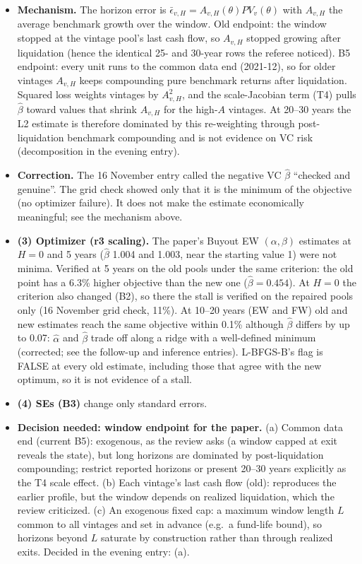 \documentclass[11pt]{article}
\newcommand{\code}[1]{\texttt{\detokenize{#1}}}
\begin{document}
\begin{itemize}
\item \textbf{Mechanism.} The horizon error is $\bar\epsilon_{v,H}=A_{v,H}(\theta)PV_v(\theta)$ with $A_{v,H}$ the average benchmark growth over the window. Old endpoint: the window stopped at the vintage pool's last cash flow, so $A_{v,H}$ stopped growing after liquidation (hence the identical 25- and 30-year rows the referee noticed). B5 endpoint: every unit runs to the common data end (2021-12), so for older vintages $A_{v,H}$ keeps compounding pure benchmark returns after liquidation. Squared loss weights vintages by $A_{v,H}^2$, and the scale-Jacobian term (T4) pulls $\hat\beta$ toward values that shrink $A_{v,H}$ for the high-$A$ vintages. At 20--30 years the L2 estimate is therefore dominated by this re-weighting through post-liquidation benchmark compounding and is not evidence on VC risk (decomposition in the evening entry).
\item \textbf{Correction.} The 16 November entry called the negative VC $\hat\beta$ ``checked and genuine''. The grid check showed only that it is the minimum of the objective (no optimizer failure). It does not make the estimate economically meaningful; see the mechanism above.
\item \textbf{(3) Optimizer (r3 scaling).} The paper's Buyout EW $(\alpha,\beta)$ estimates at $H=0$ and 5 years ($\hat\beta$ 1.004 and 1.003, near the starting value 1) were not minima. Verified at 5 years on the old pools under the same criterion: the old point has a 6.3\% higher objective than the new one ($\hat\beta=0.454$). At $H=0$ the criterion also changed (B2), so there the stall is verified on the repaired pools only (16 November grid check, 11\%). At 10--20 years (EW and FW) old and new estimates reach the same objective within 0.1\% although $\hat\beta$ differs by up to 0.07: $\hat\alpha$ and $\hat\beta$ trade off along a ridge with a well-defined minimum (corrected; see the follow-up and inference entries). L-BFGS-B's \code{kkt1} flag is FALSE at every old estimate, including those that agree with the new optimum, so it is not evidence of a stall.
\item \textbf{(4) SEs (B3)} change only standard errors.
\item \textbf{Decision needed: window endpoint for the paper.} (a) Common data end (current B5): exogenous, as the review asks (a window capped at exit reveals the state), but long horizons are dominated by post-liquidation compounding; restrict reported horizons or present 20--30 years explicitly as the T4 scale effect. (b) Each vintage's last cash flow (old): reproduces the earlier profile, but the window depends on realized liquidation, which the review criticized. (c) An exogenous fixed cap: a maximum window length $L$ common to all vintages and set in advance (e.g.\ a fund-life bound), so horizons beyond $L$ saturate by construction rather than through realized exits. Decided in the evening entry: (a).
\end{itemize}
\end{document}
